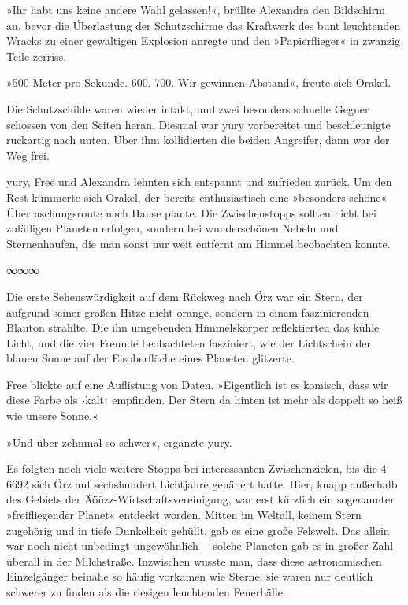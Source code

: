 »Ihr habt uns keine andere Wahl gelassen!«, brüllte Alexandra den Bildschirm an, bevor die Überlastung der Schutzschirme das Kraftwerk des bunt leuchtenden Wracks zu einer gewaltigen Explosion anregte und den »Papierflieger« in zwanzig Teile zerriss.

»500 Meter pro Sekunde. 600. 700. Wir gewinnen Abstand«, freute sich Orakel.

Die Schutzschilde waren wieder intakt, und zwei besonders schnelle Gegner schossen von den Seiten heran. Diesmal war yury vorbereitet und beschleunigte ruckartig nach unten. Über ihm kollidierten die beiden Angreifer, dann war der Weg frei.


yury, Free und Alexandra lehnten sich entspannt und zufrieden zurück. Um den Rest kümmerte sich Orakel, der bereits enthusiastisch eine »besonders schöne« Überraschungsroute nach Hause plante. Die Zwischenstopps sollten nicht bei zufälligen Planeten erfolgen, sondern bei wunderschönen Nebeln und Sternenhaufen, die man sonst nur weit entfernt am Himmel beobachten konnte.

\begin{center}
    ∞∞∞
\end{center}

Die erste Sehenswürdigkeit auf dem Rückweg nach Örz war ein Stern, der aufgrund seiner großen Hitze nicht orange, sondern in einem faszinierenden Blauton strahlte. Die ihn umgebenden Himmelskörper reflektierten das kühle Licht, und die vier Freunde beobachteten fasziniert, wie der Lichtschein der blauen Sonne auf der Eisoberfläche eines Planeten glitzerte.

Free blickte auf eine Auflistung von Daten. »Eigentlich ist es komisch, dass wir diese Farbe als ›kalt‹ empfinden. Der Stern da hinten ist mehr als doppelt so heiß wie unsere Sonne.«

»Und über zehnmal so schwer«, ergänzte yury.

Es folgten noch viele weitere Stopps bei interessanten Zwischenzielen, bis die 4-6692 sich Örz auf sechshundert Lichtjahre genähert hatte. Hier, knapp außerhalb des Gebiets der Äöüzz-Wirtschaftsvereinigung, war erst kürzlich ein sogenannter »freifliegender Planet« entdeckt worden. Mitten im Weltall, keinem Stern zugehörig und in tiefe Dunkelheit gehüllt, gab es eine große Felswelt. Das allein war noch nicht unbedingt ungewöhnlich~– solche Planeten gab es in großer Zahl überall in der Milchstraße. Inzwischen wusste man, dass diese astronomischen Einzelgänger beinahe so häufig vorkamen wie Sterne; sie waren nur deutlich schwerer zu finden als die riesigen leuchtenden Feuerbälle.

